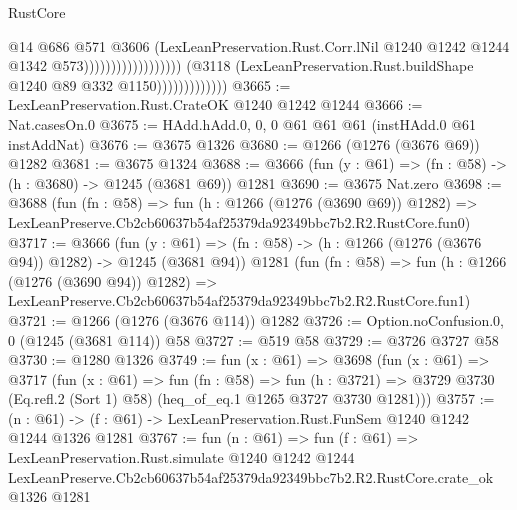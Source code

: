 \begin{lexlean}{RustCore}
\begin{coremodule}
                                                            @14
                                                            @686
                                                            @571
                                                            @3606
                                                            (LexLeanPreservation.Rust.Corr.lNil
                                                              @1240
                                                              @1242
                                                              @1244
                                                              @1342
                                                              @573))))))))))))))))))
                          (@3118
                            (LexLeanPreservation.Rust.buildShape @1240 @89 @332 @1150)))))))))))))
@3665 := LexLeanPreservation.Rust.CrateOK @1240 @1242 @1244
@3666 := Nat.casesOn.{0}
@3675 := HAdd.hAdd.{0, 0, 0} @61 @61 @61 (instHAdd.{0} @61 instAddNat)
@3676 := @3675 @1326
@3680 := @1266 (@1276 (@3676 @69)) @1282
@3681 := @3675 @1324
@3688 := @3666 (fun (y : @61) => (fn : @58) -> (h : @3680) -> @1245 (@3681 @69)) @1281
@3690 := @3675 Nat.zero
@3698 := @3688
    (fun (fn : @58) =>
    fun (h : @1266 (@1276 (@3690 @69)) @1282) =>
    LexLeanPreserve.Cb2cb60637b54af25379da92349bbc7b2.R2.RustCore.fun0)
@3717 := @3666
    (fun (y : @61) => (fn : @58) -> (h : @1266 (@1276 (@3676 @94)) @1282) -> @1245 (@3681 @94))
    @1281
    (fun (fn : @58) =>
    fun (h : @1266 (@1276 (@3690 @94)) @1282) =>
    LexLeanPreserve.Cb2cb60637b54af25379da92349bbc7b2.R2.RustCore.fun1)
@3721 := @1266 (@1276 (@3676 @114)) @1282
@3726 := Option.noConfusion.{0, 0} (@1245 (@3681 @114)) @58
@3727 := @519 @58
@3729 := @3726 @3727 @58
@3730 := @1280 @1326
@3749 := fun (x : @61) =>
  @3698
    (fun (x : @61) =>
    @3717
      (fun (x : @61) =>
      fun (fn : @58) =>
      fun (h : @3721) =>
      @3729 @3730 (Eq.refl.{2} (Sort 1) @58) (heq_of_eq.{1} @1265 @3727 @3730 @1281)))
@3757 := (n : @61) -> (f : @61) -> LexLeanPreservation.Rust.FunSem @1240 @1242 @1244 @1326 @1281
@3767 := fun (n : @61) =>
  fun (f : @61) =>
  LexLeanPreservation.Rust.simulate
    @1240
    @1242
    @1244
    LexLeanPreserve.Cb2cb60637b54af25379da92349bbc7b2.R2.RustCore.crate_ok
    @1326
    @1281
\end{coremodule}
\end{lexlean}

